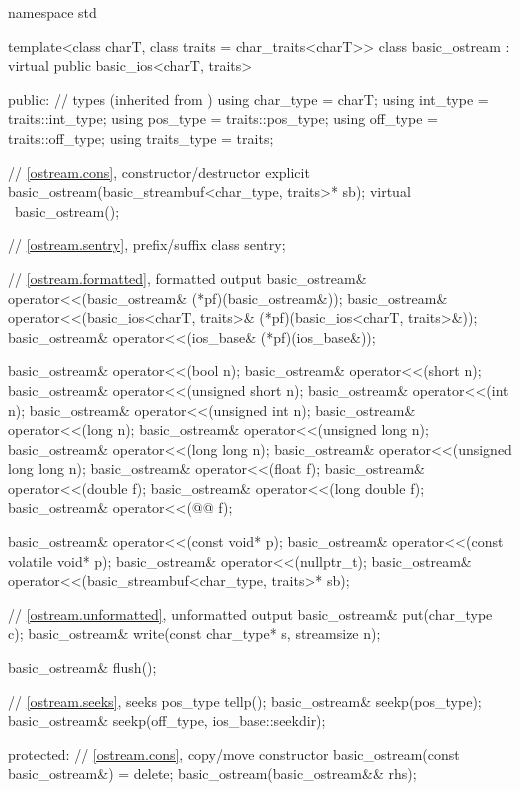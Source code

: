 %
\begin{codeblock}
namespace std {
  template<class charT, class traits = char_traits<charT>>
  class basic_ostream : virtual public basic_ios<charT, traits> {
  public:
    // types (inherited from )
    using char_type   = charT;
    using int_type    = traits::int_type;
    using pos_type    = traits::pos_type;
    using off_type    = traits::off_type;
    using traits_type = traits;

    // \ref{ostream.cons}, constructor/destructor
    explicit basic_ostream(basic_streambuf<char_type, traits>* sb);
    virtual ~basic_ostream();

    // \ref{ostream.sentry}, prefix/suffix
    class sentry;

    // \ref{ostream.formatted}, formatted output
    basic_ostream& operator<<(basic_ostream& (*pf)(basic_ostream&));
    basic_ostream& operator<<(basic_ios<charT, traits>& (*pf)(basic_ios<charT, traits>&));
    basic_ostream& operator<<(ios_base& (*pf)(ios_base&));

    basic_ostream& operator<<(bool n);
    basic_ostream& operator<<(short n);
    basic_ostream& operator<<(unsigned short n);
    basic_ostream& operator<<(int n);
    basic_ostream& operator<<(unsigned int n);
    basic_ostream& operator<<(long n);
    basic_ostream& operator<<(unsigned long n);
    basic_ostream& operator<<(long long n);
    basic_ostream& operator<<(unsigned long long n);
    basic_ostream& operator<<(float f);
    basic_ostream& operator<<(double f);
    basic_ostream& operator<<(long double f);
    basic_ostream& operator<<(@@ f);

    basic_ostream& operator<<(const void* p);
    basic_ostream& operator<<(const volatile void* p);
    basic_ostream& operator<<(nullptr_t);
    basic_ostream& operator<<(basic_streambuf<char_type, traits>* sb);

    // \ref{ostream.unformatted}, unformatted output
    basic_ostream& put(char_type c);
    basic_ostream& write(const char_type* s, streamsize n);

    basic_ostream& flush();

    // \ref{ostream.seeks}, seeks
    pos_type tellp();
    basic_ostream& seekp(pos_type);
    basic_ostream& seekp(off_type, ios_base::seekdir);

  protected:
    // \ref{ostream.cons}, copy/move constructor
    basic_ostream(const basic_ostream&) = delete;
    basic_ostream(basic_ostream&& rhs);

}}
\end{codeblock}
